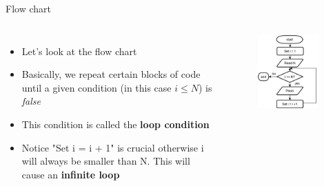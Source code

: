 \documentclass[10pt,xcolor={table,dvipsnames},t]{beamer}
\begin{document}
\begin{frame}{Flow chart}
  \begin{columns}
    \begin{itemize}
      \item Let's look at the flow chart
      \item Basically, we repeat certain blocks of code until a given condition (in this case $i\leq N$) is \textit{false}
      \item This condition is called the \textbf{loop condition}
      \item Notice "Set i = i + 1" is crucial otherwise i will always be smaller than N. This will cause an \textbf{infinite loop}
    \end{itemize}
    \begin{figure}
      \includegraphics[width=0.9\textwidth]{img/print_first_n_flowchart.png}
    \end{figure}
  \end{columns}
\end{frame}
\end{document}
